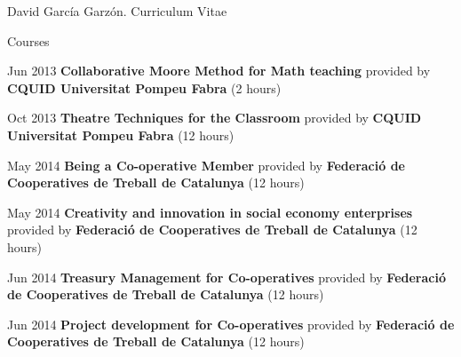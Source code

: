 \documentclass{article}
\begin{document}
\begin{cv}{David García Garzón. Curriculum Vitae}
\begin{cvlist}{Courses}
\item[Jun 2013]
	{\bf Collaborative Moore Method for Math teaching } provided by {\bf CQUID Universitat Pompeu Fabra} (2 hours)

\item[Oct 2013]
	{\bf Theatre Techniques for the Classroom } provided by {\bf CQUID Universitat Pompeu Fabra} (12 hours)

\item[May 2014]
	{\bf Being a Co-operative Member } provided by {\bf Federació de Cooperatives de Treball de Catalunya} (12 hours)

\item[May 2014]
	{\bf Creativity and innovation in social economy enterprises } provided by {\bf Federació de Cooperatives de Treball de Catalunya} (12 hours)

\item[Jun 2014]
	{\bf Treasury Management for Co-operatives } provided by {\bf Federació de Cooperatives de Treball de Catalunya} (12 hours)

\item[Jun 2014]
	{\bf Project development for Co-operatives } provided by {\bf Federació de Cooperatives de Treball de Catalunya} (12 hours)

\end{cvlist}


\end{cv}
\end{document}
